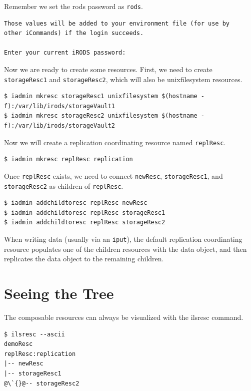 \documentclass[10pt,oneside]{memoir}
\begin{document}
\newpage

Remember we set the rods password as \texttt{rods}.

\begin{lstlisting}[basicstyle=\scriptsize\ttfamily]
Those values will be added to your environment file (for use by
other iCommands) if the login succeeds.

Enter your current iRODS password:
\end{lstlisting}

Now we are ready to create some resources. First, we need to create \texttt{storageResc1} and \texttt{storageResc2}, which will also be unixfilesystem resources.

\begin{lstlisting}[basicstyle=\scriptsize\ttfamily]
$ iadmin mkresc storageResc1 unixfilesystem $(hostname -f):/var/lib/irods/storageVault1
$ iadmin mkresc storageResc2 unixfilesystem $(hostname -f):/var/lib/irods/storageVault2
\end{lstlisting}

Now we will create a replication coordinating resource named \texttt{replResc}.

\begin{lstlisting}
$ iadmin mkresc replResc replication
\end{lstlisting}

Once \texttt{replResc} exists, we need to connect \texttt{newResc}, \texttt{storageResc1}, and \texttt{storageResc2} as children of \texttt{replResc}.

\begin{lstlisting}
$ iadmin addchildtoresc replResc newResc
$ iadmin addchildtoresc replResc storageResc1
$ iadmin addchildtoresc replResc storageResc2
\end{lstlisting}

When writing data (usually via an \texttt{iput}), the default replication coordinating resource populates one of the children resources with the data object, and then replicates the data object to the remaining children.

\section{Seeing the Tree}

The composable resources can always be visualized with the ilsresc command.

\begin{lstlisting}
$ ilsresc --ascii
demoResc
replResc:replication
|-- newResc
|-- storageResc1
@\`{}@-- storageResc2
\end{lstlisting}
\end{document}
